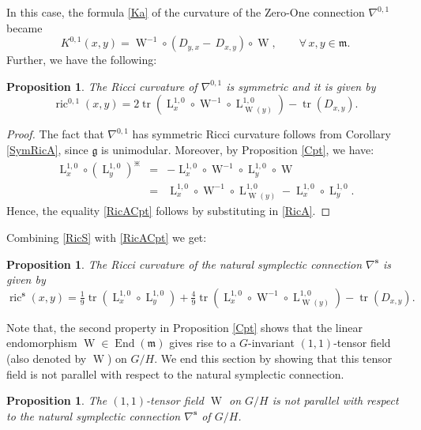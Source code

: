 \documentclass[preprint,12pt,1p]{elsarticle}
\theoremstyle{plain}
\newtheorem{proposition}[theorem]{Proposition}
\theoremstyle{definition}
\newcommand{\ro}{\circ}
\newcommand{\n}{\nabla}
\newcommand{\nc}{\n^{0,1}}
\newcommand{\ns}{\n^\mathbf{s}}
\newcommand{\tr}{\operatorname{tr}}
\newcommand{\End}{\operatorname{End}}
\newcommand{\lm}{\operatorname{L}^{1,0}}
\newcommand{\ric}{\operatorname{ric}}
\newcommand{\F}{\operatorname{W}}
\numberwithin{equation}{section}
\newcommand{\aj}{\divideontimes}
\newcommand{\Kc}{K^{0,1}}
\begin{document}
In this case, the formula \eqref{Ka} of the curvature of the Zero-One connection $\nc$ became 
\begin{equation*}
\Kc(x,y)=\F^{-1}\ro\left(D_{y,x}-\,D_{x,y}\right)\ro\F,\qquad\forall\,x,y\in\mathfrak{m}.
\end{equation*}
Further, we have the following:

\begin{proposition}
The Ricci curvature of $\nc$ is symmetric and it is given by
\begin{equation}\label{RicACpt}
\ric^{0,1}(x,y)=2\tr\left(\lm_x\ro\F^{-1}\ro\lm_{\F(y)}\right)-\tr(D_{x,y}).
\end{equation}
\end{proposition}

\begin{proof}
The fact that $\nc$ has symmetric Ricci curvature follows from Corollary \ref{SymRicA}, since $\mathfrak{g}$ is unimodular. Moreover, by Proposition \ref{Cpt}, we have:
\begin{eqnarray*}
\lm_x\ro\left(\lm_y\right)^\aj&=&-\lm_x\ro\F^{-1}\ro\lm_y\ro\F\\
&=&\lm_x\ro\F^{-1}\ro\lm_{\F(y)}-\lm_x\ro\lm_y.
\end{eqnarray*}
Hence, the equality \eqref{RicACpt} follows by substituting in \eqref{RicA}.
\end{proof}

Combining \eqref{RicS} with \eqref{RicACpt} we get:
\begin{proposition}
The Ricci curvature of the natural symplectic connection $\ns$ is given by
\begin{equation}\label{RicSCpt}
\ric^\mathbf{s}(x,y)=\tfrac{1}{9}\tr\left(\lm_x\ro\lm_y\right)+\tfrac{4}{9}\tr\left(\lm_x\ro\F^{-1}\ro\lm_{\F(y)}\right)-\tr\left(D_{x,y}\right).
\end{equation}
\end{proposition}

Note that, the second property in Proposition \ref{Cpt} shows that the linear endomorphism $\F\in\End(\mathfrak{m})$ gives rise to a $G$-invariant $(1,1)$-tensor field (also denoted by $\F$) on $G/H$. We end this section by showing that this tensor field is not parallel with respect to the natural symplectic connection.

\begin{proposition}
The $(1,1)$-tensor field $\F$ on $G/H$ is not parallel with respect to the natural symplectic connection $\ns$ of $G/H$.
\end{proposition}
\end{document}

